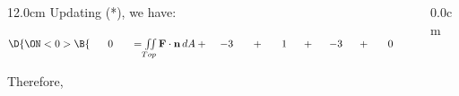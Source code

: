 \begin{frame}
\begin{columns}
\begin{column}{12.0cm}
Updating (*), we have:

%

\vspace{0.4cm}

$\D{
\ON<0>{\B{\hspace{0.6cm} 0 \hspace{0.6cm} = \iint \limits_{Top} {\bf F} \cdot {\bf n}\, dA + \hspace{0.4cm} -3 \hspace{0.6cm} + \hspace{0.6cm} 1 \hspace{0.5cm} + \hspace{0.5cm} -3 \hspace{0.5cm} + \hspace{0.6cm} 0 \hspace{0.6cm} + \hspace{0.6cm} 0 }}}$

\vspace{0.2cm}

Therefore, 

\end{column}\begin{column}{0.0cm}\end{column}\end{columns}
\end{frame}
